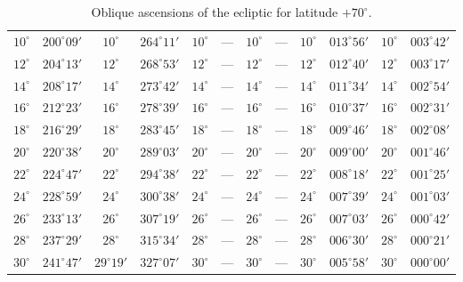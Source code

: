 \begin{table}[!h]
{\begin{tabular}{cc|cc|cc|cc|cc|cc}
$10^\circ$ & $200^\circ09'$ & $10^\circ$ & $264^\circ11'$ & $10^\circ$ & --- & $10^\circ$ & --- &  $10^\circ$ & $013^\circ56'$ & $10^\circ$ & $003^\circ42'$\\
$12^\circ$ & $204^\circ13'$ & $12^\circ$ & $268^\circ53'$ & $12^\circ$ & --- & $12^\circ$ & --- &  $12^\circ$ & $012^\circ40'$ & $12^\circ$ & $003^\circ17'$\\
$14^\circ$ & $208^\circ17'$ & $14^\circ$ & $273^\circ42'$ & $14^\circ$ & --- & $14^\circ$ & --- &  $14^\circ$ & $011^\circ34'$ & $14^\circ$ & $002^\circ54'$\\
$16^\circ$ & $212^\circ23'$ & $16^\circ$ & $278^\circ39'$ & $16^\circ$ & --- & $16^\circ$ & --- &  $16^\circ$ & $010^\circ37'$ & $16^\circ$ & $002^\circ31'$\\
$18^\circ$ & $216^\circ29'$ & $18^\circ$ & $283^\circ45'$ & $18^\circ$ & --- & $18^\circ$ & --- &  $18^\circ$ & $009^\circ46'$ & $18^\circ$ & $002^\circ08'$\\
$20^\circ$ & $220^\circ38'$ & $20^\circ$ & $289^\circ03'$ & $20^\circ$ & --- & $20^\circ$ & --- &  $20^\circ$ & $009^\circ00'$ & $20^\circ$ & $001^\circ46'$\\
$22^\circ$ & $224^\circ47'$ & $22^\circ$ & $294^\circ38'$ & $22^\circ$ & --- & $22^\circ$ & --- &  $22^\circ$ & $008^\circ18'$ & $22^\circ$ & $001^\circ25'$\\
$24^\circ$ & $228^\circ59'$ & $24^\circ$ & $300^\circ38'$ & $24^\circ$ & --- & $24^\circ$ & --- &  $24^\circ$ & $007^\circ39'$ & $24^\circ$ & $001^\circ03'$\\
$26^\circ$ & $233^\circ13'$ & $26^\circ$ & $307^\circ19'$ & $26^\circ$ & --- & $26^\circ$ & --- &  $26^\circ$ & $007^\circ03'$ & $26^\circ$ & $000^\circ42'$\\
$28^\circ$ & $237^\circ29'$ & $28^\circ$ & $315^\circ34'$ & $28^\circ$ & --- & $28^\circ$ & --- &  $28^\circ$ & $006^\circ30'$ & $28^\circ$ & $000^\circ21'$\\
$30^\circ$ & $241^\circ47'$ & $29^\circ19'$&$327^\circ07'$  & $30^\circ$ & --- & $30^\circ$ & --- &  $30^\circ$ & $005^\circ58'$ & $30^\circ$ & $000^\circ00'$\\
\end{tabular}}
\caption{Oblique ascensions of the ecliptic for latitude $+70^\circ$.}
\end{table}

